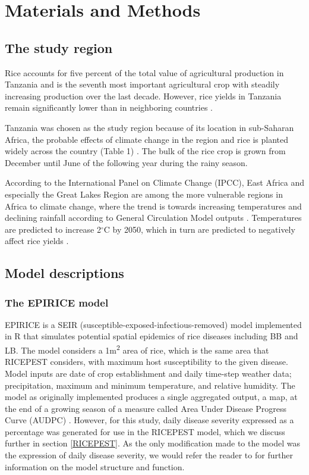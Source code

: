 \section{Materials and Methods}
\label{m_and_m}
\subsection{The study region}
\label{study_region}
        Rice accounts for five percent of the total value of agricultural production in Tanzania and is the seventh most important agricultural crop with steadily increasing production over the last decade. However, rice yields in Tanzania remain significantly lower than in neighboring countries \citep{Barreiro-Hurle2012}.
    
    Tanzania was chosen as the study region because of its location in sub-Saharan Africa, the probable effects of climate change in the region and rice is planted widely across the country  (Table 1) \citep{Rowhani2011}. The bulk of the rice crop is grown from December until June of the following year during the rainy season. 
    
    According to the International Panel on Climate Change (IPCC), East Africa and especially the Great Lakes Region are among the more vulnerable regions in Africa to climate change, where the trend is towards increasing temperatures and declining rainfall according to General Circulation Model outputs \citep{Boko2007}. Temperatures are predicted to increase 2$^{\circ}$C by 2050, which in turn are predicted to negatively affect rice yields \citep{Rowhani2011}.
    
    \subsection{Model descriptions}
    \label{model_desc}
    \subsubsection{The EPIRICE model} \label{EPIRICE}
    EPIRICE \citep{Savary2012} is a SEIR (susceptible-exposed-infectious-removed) model \citep{Kermack1927,Madden2006} implemented in R \citep{R2014} that simulates potential spatial epidemics of rice diseases including BB and LB. The model considers a 1m\textsuperscript{2} area of rice, which is the same area that RICEPEST considers, with maximum host susceptibility to the given disease. Model inputs are date of crop establishment and daily time-step weather data; precipitation, maximum and minimum temperature, and relative humidity. The model as originally implemented produces a single aggregated output, a map, at the end of a growing season of a measure called Area Under Disease Progress Curve (AUDPC) \citep{Madden2007}. However, for this study, daily disease severity expressed as a percentage was generated for use in the RICEPEST model, which we discuss further in section \ref{RICEPEST}. As the only modification made to the model was the expression of daily disease severity, we  would refer the reader to \citep{Savary2012} for further information on the model structure and function.
    
